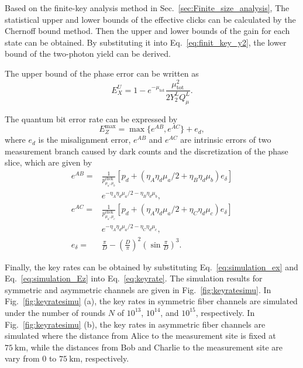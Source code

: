 \documentclass[aps,twocolumn,superscriptaddress,showpacs,nofootinbib]{revtex4-2}
\begin{document}
Based on the finite-key analysis method in Sec.~\ref{sec:Finite_size_analysis}, The statistical upper and lower bounds of the effective clicks can be calculated by the Chernoff bound method. Then the upper and lower bounds of the gain for each state can be obtained. By substituting it into Eq.~\eqref{eq:finit_key_y2}, the lower bound of the two-photon yield can be derived.

The upper bound of the phase error can be written as
\begin{equation}\label{eq:simulation_ex}
	E^U_X = 1 - e^{-\mu_\text{tot}} \frac{\mu_\text{tot}^2}{2 Y_2^L Q_\mu^L}.
\end{equation}

The quantum bit error rate can be expressed by
\begin{equation}\label{eq:simulation_Ez}
	E_Z^\text{max} = \max\{e^{AB}, e^{AC}\} + e_d,
\end{equation}
where $e_d$ is the misalignment error, $e^{AB}$ and $e^{AC}$ are intrinsic errors of two measurement branch caused by dark counts and the discretization of the phase slice, which are given by
\begin{equation}
	\begin{split}
	e^{AB} = &\frac{1}{p_{\mu_a,\mu_b}^\text{click}} \left[p_d + (\eta_{A}\eta_d \mu_a/2 + \eta_{B}\eta_d \mu_b)e_\delta \right]\\
& e^{-\eta_{A}\eta_d \mu_a/2 - \eta_{B}\eta_d \mu_b},\\
	e^{AC} = &\frac{1}{p_{\mu_a,\mu_c}^\text{click}} \left[p_d + (\eta_{A}\eta_d \mu_a/2 + \eta_{C}\eta_d \mu_c)e_\delta \right] \\
&e^{-\eta_{A}\eta_d \mu_a/2 - \eta_{C}\eta_d \mu_c},\\
	e_\delta = &\frac{\pi}{D} - \left(\frac{D}{\pi}\right)^2 \left( \sin \frac{\pi}{D} \right)^3.
	\end{split}
\end{equation}

Finally, the key rates can be obtained by substituting Eq.~\eqref{eq:simulation_ex} and Eq.~\eqref{eq:simulation_Ez} into Eq.~\eqref{eq:keyrate}. The simulation results for symmetric and asymmetric channels are given in Fig.~\ref{fig:keyratesimu}. In Fig.~\ref{fig:keyratesimu} (a), the key rates in symmetric fiber channels are simulated under the number of rounds $N$ of $10^{13}$, $10^{14}$, and $10^{15}$, respectively. In Fig.~\ref{fig:keyratesimu} (b), the key rates in asymmetric fiber channels are simulated where the distance from Alice to the measurement site is fixed at $\SI{75}{\km} $, while the distances from Bob and Charlie to the measurement site are vary from 0 to $\SI{75}{\km} $, respectively.
\end{document}
